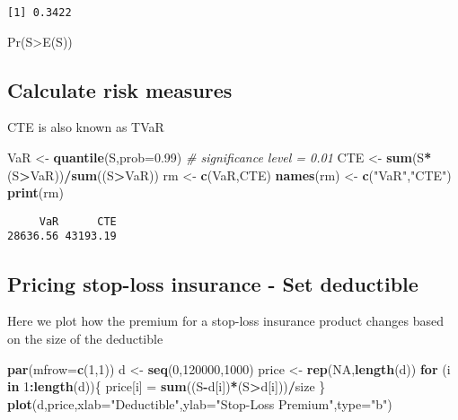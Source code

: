 \documentclass[]{book}
\newenvironment{Shaded}{\begin{snugshade}}{\end{snugshade}}
\newcommand{\KeywordTok}[1]{\textcolor[rgb]{0.13,0.29,0.53}{\textbf{#1}}}
\newcommand{\DataTypeTok}[1]{\textcolor[rgb]{0.13,0.29,0.53}{#1}}
\newcommand{\DecValTok}[1]{\textcolor[rgb]{0.00,0.00,0.81}{#1}}
\newcommand{\FloatTok}[1]{\textcolor[rgb]{0.00,0.00,0.81}{#1}}
\newcommand{\StringTok}[1]{\textcolor[rgb]{0.31,0.60,0.02}{#1}}
\newcommand{\CommentTok}[1]{\textcolor[rgb]{0.56,0.35,0.01}{\textit{#1}}}
\newcommand{\OtherTok}[1]{\textcolor[rgb]{0.56,0.35,0.01}{#1}}
\newcommand{\ControlFlowTok}[1]{\textcolor[rgb]{0.13,0.29,0.53}{\textbf{#1}}}
\newcommand{\OperatorTok}[1]{\textcolor[rgb]{0.81,0.36,0.00}{\textbf{#1}}}
\newcommand{\NormalTok}[1]{#1}
\theoremstyle{definition}
\theoremstyle{definition}
\theoremstyle{definition}
\theoremstyle{remark}
\begin{document}
\begin{verbatim}
[1] 0.3422
\end{verbatim}

Pr(S\textgreater{}E(S))

\subsection{Calculate risk measures}\label{calculate-risk-measures}

CTE is also known as TVaR

\begin{Shaded}
\begin{Highlighting}[]
\NormalTok{VaR <-}\StringTok{ }\KeywordTok{quantile}\NormalTok{(S,}\DataTypeTok{prob=}\FloatTok{0.99}\NormalTok{)         }\CommentTok{# significance level = 0.01}
\NormalTok{CTE <-}\StringTok{ }\KeywordTok{sum}\NormalTok{(S}\OperatorTok{*}\NormalTok{(S}\OperatorTok{>}\NormalTok{VaR))}\OperatorTok{/}\KeywordTok{sum}\NormalTok{((S}\OperatorTok{>}\NormalTok{VaR))}
\NormalTok{rm <-}\StringTok{ }\KeywordTok{c}\NormalTok{(VaR,CTE)}
\KeywordTok{names}\NormalTok{(rm) <-}\StringTok{ }\KeywordTok{c}\NormalTok{(}\StringTok{"VaR"}\NormalTok{,}\StringTok{"CTE"}\NormalTok{)}
\KeywordTok{print}\NormalTok{(rm)}
\end{Highlighting}
\end{Shaded}

\begin{verbatim}
     VaR      CTE 
28636.56 43193.19 
\end{verbatim}

\subsection{Pricing stop-loss insurance - Set
deductible}\label{pricing-stop-loss-insurance---set-deductible}

Here we plot how the premium for a stop-loss insurance product changes
based on the size of the deductible

\begin{Shaded}
\begin{Highlighting}[]
\KeywordTok{par}\NormalTok{(}\DataTypeTok{mfrow=}\KeywordTok{c}\NormalTok{(}\DecValTok{1}\NormalTok{,}\DecValTok{1}\NormalTok{))}
\NormalTok{d <-}\StringTok{ }\KeywordTok{seq}\NormalTok{(}\DecValTok{0}\NormalTok{,}\DecValTok{120000}\NormalTok{,}\DecValTok{1000}\NormalTok{)}
\NormalTok{price <-}\StringTok{ }\KeywordTok{rep}\NormalTok{(}\OtherTok{NA}\NormalTok{,}\KeywordTok{length}\NormalTok{(d))}
\ControlFlowTok{for}\NormalTok{ (i }\ControlFlowTok{in} \DecValTok{1}\OperatorTok{:}\KeywordTok{length}\NormalTok{(d))\{}
\NormalTok{  price[i] =}\StringTok{ }\KeywordTok{sum}\NormalTok{((S}\OperatorTok{-}\NormalTok{d[i])}\OperatorTok{*}\NormalTok{(S}\OperatorTok{>}\NormalTok{d[i]))}\OperatorTok{/}\NormalTok{size}
\NormalTok{\}}
\KeywordTok{plot}\NormalTok{(d,price,}\DataTypeTok{xlab=}\StringTok{"Deductible"}\NormalTok{,}\DataTypeTok{ylab=}\StringTok{"Stop-Loss Premium"}\NormalTok{,}\DataTypeTok{type=}\StringTok{"b"}\NormalTok{)}
\end{Highlighting}
\end{Shaded}
\end{document}

